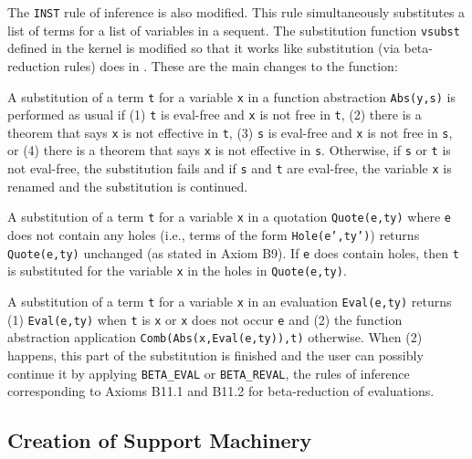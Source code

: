 \documentclass[fleqn]{llncs}
\begin{document}
\vspace*{-7mm}
The {\HL} \texttt{INST} rule of inference is also modified.  This rule
simultaneously substitutes a list of terms for a list of variables in
a sequent.  The substitution function \texttt{vsubst} defined in the
{\HL} kernel is modified so that it works like substitution (via
beta-reduction  rules) does in {\churchqe}.  These are the
main changes to the function:

\be

  \item A substitution of a term \texttt{t} for a variable \texttt{x}
    in a function abstraction \texttt{Abs(y,s)} is performed as usual
    if (1) \texttt{t} is eval-free and \texttt{x} is not free in
    \texttt{t}, (2) there is a theorem that says \texttt{x} is not
    effective in \texttt{t}, (3) \texttt{s} is eval-free and
    \texttt{x} is not free in \texttt{s}, or (4) there is a theorem
    that says \texttt{x} is not effective in \texttt{s}.  Otherwise,
    if \texttt{s} or \texttt{t} is not eval-free, the substitution
    fails and if \texttt{s} and \texttt{t} are eval-free, the variable
    \texttt{x} is renamed and the substitution is continued.

  \item A substitution of a term \texttt{t} for a variable \texttt{x}
    in a quotation \texttt{Quote(e,ty)} where \texttt{e} does not
    contain any holes (i.e., terms of the form \texttt{Hole(e',ty')})
    returns \texttt{Quote(e,ty)} unchanged (as stated in Axiom B9).
    If \texttt{e} does contain holes, then \texttt{t} is substituted
    for the variable \texttt{x} in the holes in \texttt{Quote(e,ty)}.

  \item A substitution of a term \texttt{t} for a variable \texttt{x}
    in an evaluation \texttt{Eval(e,ty)} returns (1)
    \texttt{Eval(e,ty)} when \texttt{t} is \texttt{x} or \texttt{x}
    does not occur \texttt{e} and (2) the function abstraction
    application \texttt{Comb(Abs(x,Eval(e,ty)),t)} otherwise.  When
    (2) happens, this part of the substitution is finished and the
    user can possibly continue it by applying \texttt{BETA\_EVAL} or
    \texttt{BETA\_REVAL}, the rules of inference corresponding to
    Axioms B11.1 and B11.2 for beta-reduction of evaluations.

\ee

\subsection{Creation of Support Machinery}\label{subsec:machinery}
\end{document}
